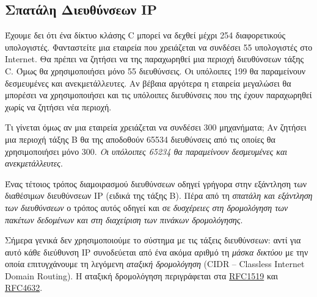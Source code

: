 %
%
\subsection{Σπατάλη Διευθύνσεων IP}

Έχουμε δει ότι ένα δίκτυο κλάσης C μπορεί να δεχθεί μέχρι 254 διαφορετικούς υπολογιστές. Φανταστείτε μια εταιρεία που χρειάζεται να συνδέσει 55 υπολογιστές στο Internet. Θα πρέπει να ζητήσει να της παραχωρηθεί μια περιοχή διευθύνσεων τάξης C. Όμως θα χρησιμοποιήσει μόνο 55 διευθύνσεις. Οι υπόλοιπες 199 θα παραμείνουν δεσμευμένες και ανεκμετάλλευτες. Αν βέβαια αργότερα η εταιρεία μεγαλώσει θα μπορέσει να χρησιμοποιήσει και τις υπόλοιπες διευθύνσεις που της έχουν παραχωρηθεί χωρίς να ζητήσει νέα περιοχή.

Τι γίνεται όμως αν μια εταιρεία χρειάζεται να συνδέσει 300 μηχανήματα; Αν ζητήσει μια περιοχή τάξης Β θα της αποδοθούν 65534 διευθύνσεις από τις οποίες θα χρησιμοποιήσει μόνο 300. \emph{Οι υπόλοιπες 65234 θα παραμείνουν δεσμευμένες και ανεκμετάλλευτες}. 

Ένας τέτοιος τρόπος διαμοιρασμού διευθύνσεων οδηγεί γρήγορα στην εξάντληση των διαθέσιμων διευθύνσεων IP (ειδικά της τάξης Β). Πέρα από τη \emph{σπατάλη και εξάντληση των διευθύνσεων} ο τρόπος αυτός οδηγεί και σε \emph{δυσχέρειες στη δρομολόγηση των πακέτων δεδομένων και στη διαχείριση των πινάκων δρομολόγησης}.

Σήμερα γενικά δεν χρησιμοποιούμε το σύστημα με τις τάξεις διευθύνσεων: αντί για αυτό κάθε διεύθυνση IP συνοδεύεται από ένα ακόμα αριθμό τη \emph{μάσκα δικτύου} με την οποία επιτυγχάνουμε τη λεγόμενη \emph{αταξική δρομολόγηση} (CIDR -- Classless Internet Domain Routing). Η αταξική δρομολόγηση περιγράφεται στα \href{https://www.ietf.org/rfc/rfc1519.txt}{RFC1519} και \href{https://www.ietf.org/rfc/rfc4632.txt}{RFC4632}.